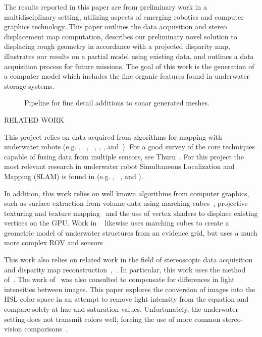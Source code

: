\documentclass[twocolumn]{article}
\makeatletter
\def\section{\@startsection{section}{1}{\z@}{24pt plus 2 pt
minus 2 pt} {12pt plus 2pt minus 2pt}{\large\bf}}
\makeatother
\begin{document}
The results reported in this paper are from preliminary work in a multidisciplinary setting, utilizing aspects of emerging robotics and computer graphics technology.  This paper outlines the data acquisition and stereo displacement map computation, describes our preliminary novel solution to displacing rough geometry in accordance with a projected disparity map, illustrates our results on a partial model using existing data, and outlines a data acquisition process for future missions. The goal of this work is the generation of a computer model which includes the fine organic features found in underwater storage systems.

\begin{figure*}[!ht]
  \vspace{-0.2cm}
  \caption{Pipeline for fine detail additions to sonar generated meshes.}
 \label{fig:systemblock}
\end{figure*}

\section{\uppercase{Related Work}}
\label{sec:data}

This project relies on data acquired from algorithms for mapping with underwater robots (e.g. \cite{Williams2000}, ~\cite{Williams09}, ~\cite{opizarro-2009a}, \cite{Fairfield2005,Fairfield2006}, \cite{Clark2008b}, and~\cite{White10}). For a good survey of the core techniques capable of fusing data from multiple sensors, see Thurn~\cite{Thrun2005}.
For this project the most relevant  research in underwater robot Simultaneous Localization and Mapping (SLAM) is found in (e.g. \cite{Williams2000}, ~\cite{harbor}, and \cite{Fairfield2005,Fairfield2006}).  

In addition, this work relies on well known algorithms from computer graphics, such as surface extraction from volume data using marching cubes~\cite{Lorensen}, projective texturing and texture mapping~\cite{Williams78castingcurved,Segal} and the use of vertex shaders to displace existing vertices on the GPU. Work in ~\cite{Fairfield:2010} likewise uses marching cubes to create a geometric model of underwater structures from an evidence grid, but uses a much more complex ROV and sensors

This work also relies on related work in the field of stereoscopic data acquisition and disparity map reconstruction~\cite{stereo:gutMarroquin},~\cite{stereo:scharsteinSzeliski}.
  In particular, this work uses the method of~\cite{stereo:zitKan}.
  The work of~\cite{stereo:nalGast} was also consulted to compensate for differences in light intensities between images.
  This paper explores the conversion of images into the HSL color space in an attempt to remove light intensity from the equation and compare solely at hue and saturation values.
  Unfortunately, the underwater setting does not transmit colors well, forcing the use of more common stereo-vision comparisons~\cite{stereo:nalpantidis2008review}. 
\end{document}
